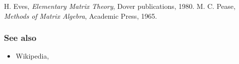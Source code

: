\documentclass[12pt]{article}
\begin{document}
\begin{thebibliography}{9}
  H. Eves, \emph{Elementary Matrix Theory}, Dover publications, 1980.
 M. C. Pease,
 \emph{Methods of Matrix Algebra},  Academic Press, 1965.
 \end{thebibliography}


\subsubsection*{See also}
\begin{itemize}
 \item Wikipedia, 
\end{itemize}
\end{document}

